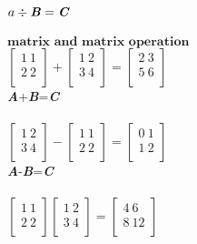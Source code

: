 \documentclass[12pt]{minimal}
\begin{document}
$
a \div \textbf{\textit{B}} = \textbf{\textit{C}} 
$ \\ \\ 

$
\textbf{matrix and matrix operation} 
$ \\ 

$
\begin{bmatrix}
    1\ 1\\
    2\ 2\\
\end{bmatrix} +
\begin{bmatrix}
    1\ 2\\
    3\ 4\\
\end{bmatrix} =
\begin{bmatrix}
    2\ 3\\
    5\ 6\\
\end{bmatrix}
$ \\

\textbf{\textit{A}}+\textbf{\textit{B}}=\textbf{\textit{C}} \\ \\ 

$
\begin{bmatrix}
    1\ 2\\
    3\ 4\\
\end{bmatrix} -
\begin{bmatrix}
    1\ 1\\
    2\ 2\\
\end{bmatrix} =
\begin{bmatrix}
    0\ 1\\
    1\ 2\\
\end{bmatrix}
$ \\

\textbf{\textit{A}}-\textbf{\textit{B}}=\textbf{\textit{C}} \\ \\ 

$
\begin{bmatrix}
    1\ 1\\
    2\ 2\\
\end{bmatrix}
\begin{bmatrix}
    1\ 2\\
    3\ 4\\
\end{bmatrix} = 
\begin{bmatrix}
    4\ 6\\
    8\ 12\\
\end{bmatrix}
$ \\ 
\end{document}
